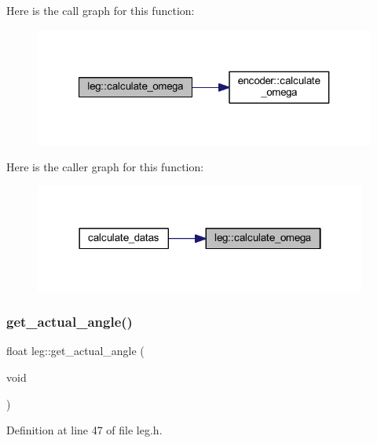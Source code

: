 Here is the call graph for this function\+:
\nopagebreak
\begin{figure}[H]
\begin{center}
\leavevmode
\includegraphics[width=321pt]{classleg_a79d1ecb4f9726e93192d77e596259905_cgraph}
\end{center}
\end{figure}
Here is the caller graph for this function\+:
\nopagebreak
\begin{figure}[H]
\begin{center}
\leavevmode
\includegraphics[width=310pt]{classleg_a79d1ecb4f9726e93192d77e596259905_icgraph}
\end{center}
\end{figure}
\mbox{\label{classleg_afcbf0d3a49ba8e092529f74364321e54}} 
\subsubsection{\texorpdfstring{get\_actual\_angle()}{get\_actual\_angle()}}
{\footnotesize\ttfamily float leg\+::get\+\_\+actual\+\_\+angle (\begin{DoxyParamCaption}\item[{void}]{ }\end{DoxyParamCaption})\hspace{0.3cm}{\ttfamily [inline]}}



Definition at line 47 of file leg.\+h.

